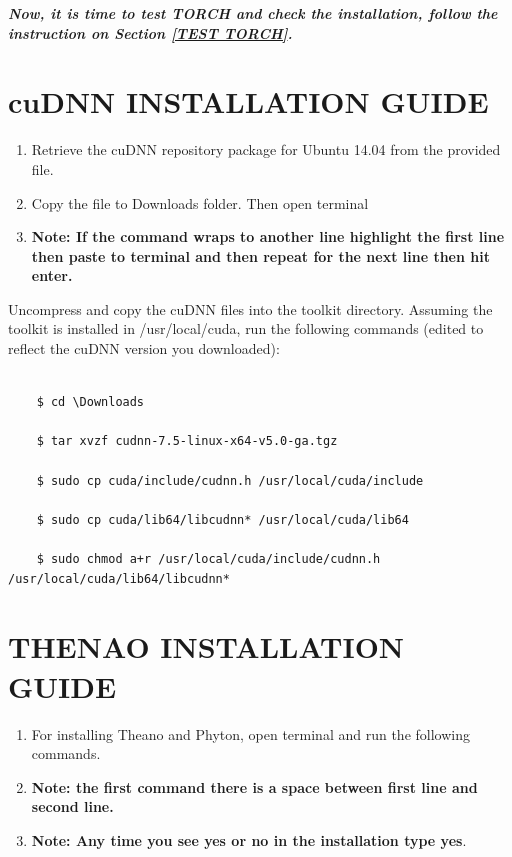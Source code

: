 \documentclass[12pt]{article}
\begin{document}
\textbf{\emph{Now, it is time to test TORCH and check the installation, follow the instruction on Section \ref{TEST TORCH}.}}

\newpage
\section{cuDNN INSTALLATION GUIDE}

\begin{enumerate}
  \item Retrieve the cuDNN repository package for Ubuntu 14.04 from the provided file.
  \item Copy the file to Downloads folder. Then open terminal
  \item \textbf{Note: If the command wraps to another line highlight the first line then paste to terminal and then repeat for the next line then hit enter.}
\end{enumerate}

Uncompress and copy the cuDNN files into the toolkit directory. Assuming the toolkit is installed in /usr/local/cuda, run the following commands (edited to reflect the cuDNN version you downloaded)\cite{cuDNN}:

\begin{lstlisting}

    $ cd \Downloads

    $ tar xvzf cudnn-7.5-linux-x64-v5.0-ga.tgz

    $ sudo cp cuda/include/cudnn.h /usr/local/cuda/include

    $ sudo cp cuda/lib64/libcudnn* /usr/local/cuda/lib64

    $ sudo chmod a+r /usr/local/cuda/include/cudnn.h /usr/local/cuda/lib64/libcudnn*

\end{lstlisting}

\newpage
\section{THENAO INSTALLATION GUIDE}

\begin{enumerate}
    \item For installing Theano and Phyton, open terminal and run the following commands.
    \item \textbf{Note: the first command there is a space between first line and second line.}
    \item \textbf{Note: Any time you see yes or no in the installation type yes}.
\end{enumerate}
\end{document}
